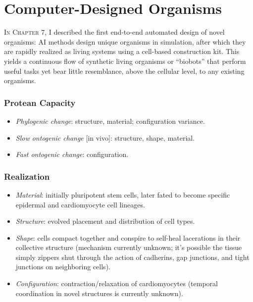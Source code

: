 



\section{Computer-Designed Organisms}


\textsc{In Chapter 7,}
I described the first end-to-end automated design of novel organisms: AI methods design unique organisms in simulation, after which they are rapidly realized as living systems using a cell-based construction kit. 
This yields a continuous flow of synthetic living organisms or ``biobots'' that perform useful tasks yet bear little resemblance, above the cellular level, to any existing organisms. 



\subsubsection*{Protean Capacity}

\begin{itemize}
    \item \textit{Phylogenic change}: structure, material; configuration variance.
    \item \textit{Slow ontogenic change} [in vivo]: structure, shape, material.
    \item \textit{Fast ontogenic change}: configuration.
\end{itemize}


\subsubsection*{Realization}

\begin{itemize}
    \item \textit{Material}: initially pluripotent stem cells, later fated to become specific epidermal and cardiomyocyte cell lineages.
    \item \textit{Structure}: evolved placement and distribution of cell types.
    \item \textit{Shape}: cells compact together and conspire to self-heal lacerations in their collective structure (mechanism currently unknown; it's possible the tissue simply zippers shut through the action of cadherins, gap junctions, and tight junctions on neighboring cells).
    
    \item \textit{Configuration}: contraction/relaxation of cardiomyocytes (temporal coordination in novel structures is currently unknown).
\end{itemize}


